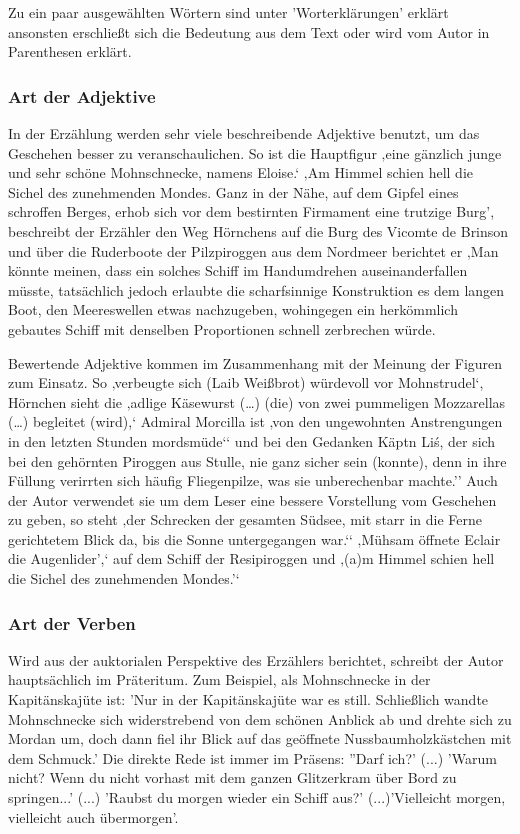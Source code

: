 Zu ein paar ausgewählten Wörtern sind unter 'Worterklärungen' erklärt \cite[S.647]{pir} ansonsten erschließt sich die Bedeutung aus dem Text oder wird vom Autor in Parenthesen erklärt.

\subsubsection{Art der Adjektive}

In der Erzählung werden sehr viele beschreibende Adjektive benutzt, um das Geschehen besser zu veranschaulichen. So ist die Hauptfigur ‚eine gänzlich junge und sehr schöne Mohnschnecke, namens Eloise.‘\cite[S.13]{pir} ‚Am Himmel schien hell die Sichel des zunehmenden Mondes. Ganz in der Nähe, auf dem Gipfel eines schroffen Berges, erhob sich vor dem bestirnten Firmament eine trutzige Burg’,\cite[S.233]{pir} beschreibt der Erzähler den Weg Hörnchens auf die Burg des Vicomte de Brinson und über die Ruderboote der Pilzpiroggen aus dem Nordmeer\cite[S.317]{pir} berichtet er ‚Man könnte meinen, dass ein solches Schiff im Handumdrehen auseinanderfallen müsste, tatsächlich jedoch erlaubte die scharfsinnige Konstruktion es dem langen Boot, den Meereswellen etwas nachzugeben, wohingegen ein herkömmlich gebautes Schiff mit denselben Proportionen schnell zerbrechen würde.\cite[S.317]{pir}

Bewertende Adjektive kommen im Zusammenhang mit der Meinung der Figuren zum Einsatz. So ‚verbeugte sich (Laib Weißbrot) würdevoll vor Mohnstrudel‘,\cite[S.85]{pir} Hörnchen sieht die ‚adlige Käsewurst (…) (die) von zwei pummeligen Mozzarellas (…) begleitet (wird),‘\cite[S.179]{pir} Admiral Morcilla ist ‚von den ungewohnten Anstrengungen in den letzten Stunden mordsmüde‘‘\cite[S.263]{pir} und bei den Gedanken Käptn Li\'s, der sich bei den gehörnten Piroggen aus Stulle, nie ganz sicher sein (konnte), denn in ihre Füllung verirrten sich häufig Fliegenpilze, was sie unberechenbar machte.’’\cite[S.317]{pir} Auch der Autor verwendet sie um dem Leser eine bessere Vorstellung vom Geschehen zu geben, so steht ‚der Schrecken der gesamten Südsee, mit starr in die Ferne gerichtetem Blick da, bis die Sonne untergegangen war.‘‘\cite[S.103]{pir} ‚Mühsam öffnete Eclair die Augenlider’,‘\cite[S.211]{pir} auf dem Schiff der Resipiroggen und ‚(a)m Himmel schien hell die Sichel des zunehmenden Mondes.’‘\cite[S.233]{pir} 


\subsubsection{Art der Verben}
Wird aus der auktorialen Perspektive des Erzählers berichtet, schreibt der Autor hauptsächlich im Präteritum. Zum Beispiel, als Mohnschnecke in der Kapitänskajüte ist: 'Nur in der Kapitänskajüte war es still. Schließlich wandte Mohnschnecke sich widerstrebend von dem schönen Anblick ab und drehte sich zu Mordan um, doch dann fiel ihr Blick auf das geöffnete Nussbaumholzkästchen mit dem Schmuck.' Die direkte Rede ist immer im Präsens: ''Darf ich?' (...) 'Warum nicht? Wenn du nicht vorhast mit dem ganzen Glitzerkram über Bord zu springen...' (...) 'Raubst du morgen wieder ein Schiff aus?' (...)'Vielleicht morgen, vielleicht auch übermorgen'.\cite[S.60f]{pir} 


